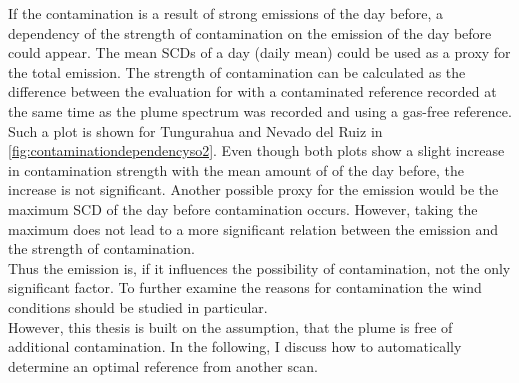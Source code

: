If the contamination is a result of strong emissions of the day before, a dependency of the strength of contamination on the emission of the day before could appear. 
The mean  SCDs of a day (daily mean) could be used as a proxy for the total emission. The strength of contamination can be calculated as the difference between the evaluation for  with a contaminated reference recorded at the same time as the plume spectrum was recorded and using a gas-free reference. Such a plot is shown for Tungurahua and Nevado del Ruiz in \cref{fig:contaminationdependencyso2}. Even though both plots show a slight increase in contamination strength with the mean amount of  of the day before, the increase is not significant. Another possible proxy for the  emission would be the maximum  SCD of the day before contamination occurs. However, taking the maximum does not lead to a more significant relation between the emission and the strength of contamination. \\
Thus the  emission is, if it influences the possibility of contamination, not the only significant factor. To further examine the reasons for contamination the wind conditions should be studied in particular. 
\\
However, this thesis is built on the assumption, that the plume is free of additional contamination. %
In the following, I discuss how to automatically determine an optimal reference from another scan.



